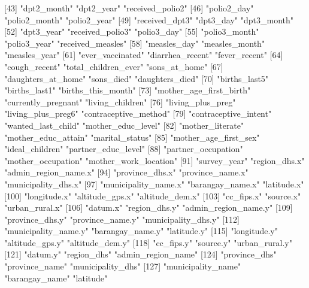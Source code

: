  [43] "dpt2_month"                "dpt2_year"                 "received_polio2"          
 [46] "polio2_day"                "polio2_month"              "polio2_year"              
 [49] "received_dpt3"             "dpt3_day"                  "dpt3_month"               
 [52] "dpt3_year"                 "received_polio3"           "polio3_day"               
 [55] "polio3_month"              "polio3_year"               "received_measles"         
 [58] "measles_day"               "measles_month"             "measles_year"             
 [61] "ever_vaccinated"           "diarrhea_recent"           "fever_recent"             
 [64] "cough_recent"              "total_children_ever"       "sons_at_home"             
 [67] "daughters_at_home"         "sons_died"                 "daughters_died"           
 [70] "births_last5"              "births_last1"              "births_this_month"        
 [73] "mother_age_first_birth"    "currently_pregnant"        "living_children"          
 [76] "living_plus_preg"          "living_plus_preg6"         "contraceptive_method"     
 [79] "contraceptive_intent"      "wanted_last_child"         "mother_educ_level"        
 [82] "mother_literate"           "mother_educ_attain"        "marital_status"           
 [85] "mother_age_first_sex"      "ideal_children"            "partner_educ_level"       
 [88] "partner_occupation"        "mother_occupation"         "mother_work_location"     
 [91] "survey_year"               "region_dhs.x"              "admin_region_name.x"      
 [94] "province_dhs.x"            "province_name.x"           "municipality_dhs.x"       
 [97] "municipality_name.x"       "barangay_name.x"           "latitude.x"               
[100] "longitude.x"               "altitude_gps.x"            "altitude_dem.x"           
[103] "cc_fips.x"                 "source.x"                  "urban_rural.x"            
[106] "datum.x"                   "region_dhs.y"              "admin_region_name.y"      
[109] "province_dhs.y"            "province_name.y"           "municipality_dhs.y"       
[112] "municipality_name.y"       "barangay_name.y"           "latitude.y"               
[115] "longitude.y"               "altitude_gps.y"            "altitude_dem.y"           
[118] "cc_fips.y"                 "source.y"                  "urban_rural.y"            
[121] "datum.y"                   "region_dhs"                "admin_region_name"        
[124] "province_dhs"              "province_name"             "municipality_dhs"         
[127] "municipality_name"         "barangay_name"             "latitude"                 
